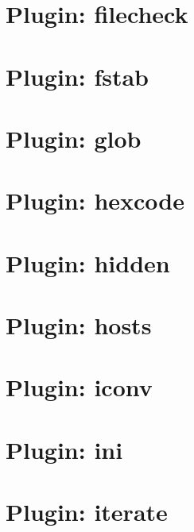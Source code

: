 \documentclass[twoside]{book}
\newcommand{\+}{\discretionary{\mbox{\scriptsize$\hookleftarrow$}}{}{}}
\begin{document}
\chapter{Plugin\+: filecheck}
\label{md_src_plugins_filecheck_README}
\hypertarget{md_src_plugins_filecheck_README}{}

\chapter{Plugin\+: fstab}
\label{md_src_plugins_fstab_README}
\hypertarget{md_src_plugins_fstab_README}{}

\chapter{Plugin\+: glob}
\label{md_src_plugins_glob_README}
\hypertarget{md_src_plugins_glob_README}{}

\chapter{Plugin\+: hexcode}
\label{md_src_plugins_hexcode_README}
\hypertarget{md_src_plugins_hexcode_README}{}

\chapter{Plugin\+: hidden}
\label{md_src_plugins_hidden_README}
\hypertarget{md_src_plugins_hidden_README}{}

\chapter{Plugin\+: hosts}
\label{md_src_plugins_hosts_README}
\hypertarget{md_src_plugins_hosts_README}{}

\chapter{Plugin\+: iconv}
\label{md_src_plugins_iconv_README}
\hypertarget{md_src_plugins_iconv_README}{}

\chapter{Plugin\+: ini}
\label{md_src_plugins_ini_README}
\hypertarget{md_src_plugins_ini_README}{}

\chapter{Plugin\+: iterate}
\label{md_src_plugins_iterate_README}
\hypertarget{md_src_plugins_iterate_README}{}

\end{document}
